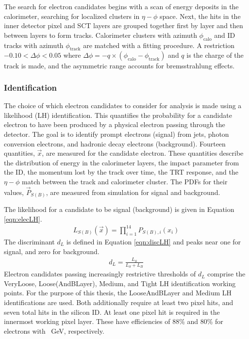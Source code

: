 The search for electron candidates begins with a scan of energy deposits in the calorimeter, searching for localized clusters in $\eta-\phi$ space.
Next, the hits in the inner detector pixel and SCT layers are grouped together first by layer and then between layers to form tracks.
Calorimeter clusters with azimuth $\phi_\text{calo}$ and ID tracks with azimuth $\phi_\text{track}$ are matched with a fitting procedure.
A restriction $-0.10<\Delta\phi<0.05$ where $\Delta\phi=-q\times(\phi_\text{calo}-\phi_\text{track})$ and $q$ is the charge of the track is made, and the asymmetric range accounts for bremsstrahlung effects. \cite{elecReco}

\subsubsection{Identification}

The choice of which electron candidates to consider for analysis is made using a likelihood (LH) identification.
This quantifies the probability for a candidate electron to have been produced by a physical electron passing through the detector.
The goal is to identify prompt electrons (signal) from jets, photon conversion electrons, and hadronic decay electrons (background).
Fourteen quantities, $\vec{x}$, are measured for the candidate electron.
These quantities describe the distribution of energy in the calorimeter layers, the impact parameter from the ID, the momentum lost by the track over time, the TRT response, and the $\eta-\phi$ match between the track and calorimeter cluster.
The PDFs for their values, $\vec{P}_{S(B)}$, are measured from simulation for signal and background.

The likelihood for a candidate to be signal (background) is given in Equation \ref{eqn:elecLH}.
\begin{equation}\begin{split}\label{eqn:elecLH}
L_{S(B)}(\vec{x}) = \prod_{i=1}^{14}P_{S(B),i}(x_i)
\end{split}\end{equation}
The discriminant $d_L$ is defined in Equation \ref{eqn:discLH} and peaks near one for signal, and zero for background.
\begin{equation}\begin{split}
d_L=\frac{L_S}{L_S+L_B}
\end{split}\end{equation} 
Electron candidates passing increasingly restrictive thresholds of $d_L$ comprise the VeryLoose, Loose(AndBLayer), Medium, and Tight LH identification working points.
For the purpose of this thesis, the LooseAndBLayer and Medium LH identifications are used.
Both additionally require at least two pixel hits, and seven total hits in the silicon ID.
At least one pixel hit is required in the innermost working pixel layer.
These have efficiencies of 88\% and 80\% for electrons with ~GeV, respectively.


